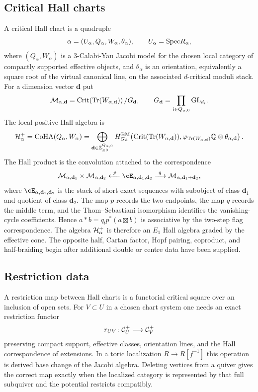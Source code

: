 \subsection*{Critical Hall charts}

A critical Hall chart is a quadruple
\[
  \alpha=(U_{\alpha},Q_{\alpha},W_{\alpha},\theta_{\alpha}),
  \qquad U_{\alpha}=\mathrm{Spec} R_{\alpha},
\]
where $(Q_{\alpha},W_{\alpha})$ is a $3$-Calabi-Yau Jacobi model for the
chosen local category of compactly supported effective objects, and
$\theta_{\alpha}$ is an orientation, equivalently a square root of the
virtual canonical line, on the associated $d$-critical moduli stack.  For
a dimension vector $\mathbf d$ put
\[
  \mathcal M_{\alpha,\mathbf d}
  =
  \mathrm{Crit}\!\left(\mathrm{Tr}(W_{\alpha,\mathbf d})\right)/
  G_{\mathbf d},
  \qquad
  G_{\mathbf d}=\prod_{i\in Q_{\alpha,0}}\mathrm{GL}_{d_i}.
\]
The local positive Hall algebra is
\[
  \mathcal H_{\alpha}^{+}
  =
  \mathrm{CoHA}(Q_{\alpha},W_{\alpha})
  =
  \bigoplus_{\mathbf d\in\mathbb Z_{\geq 0}^{Q_{\alpha,0}}}
  H^{\mathrm{BM}}_{G_{\mathbf d}}\!
  \left(
    \mathrm{Crit}(\mathrm{Tr}(W_{\alpha,\mathbf d})),
    \varphi_{\mathrm{Tr}(W_{\alpha,\mathbf d})}\mathbb Q\otimes\theta_{\alpha,\mathbf d}
  \right).
\]
The Hall product is the convolution attached to the correspondence
\[
  \cM_{\alpha,\mathbf d_1}\times\cM_{\alpha,\mathbf d_2}
  \xleftarrow{\ p\ }
  \cE_{\alpha,\mathbf d_1,\mathbf d_2}
  \xrightarrow{\ q\ }
  \cM_{\alpha,\mathbf d_1+\mathbf d_2},
\]
where $\cE_{\alpha,\mathbf d_1,\mathbf d_2}$ is the stack of short exact
sequences with subobject of class $\mathbf d_1$ and quotient of class
$\mathbf d_2$.  The map $p$ records the two endpoints, the map $q$
records the middle term, and the Thom--Sebastiani isomorphism identifies
the vanishing-cycle coefficients.  Hence $a*b=q_{!}p^{*}(a\boxtimes b)$
is associative by the two-step flag correspondence.  The algebra
$\mathcal H_{\alpha}^{+}$ is therefore an $E_1$ Hall algebra graded by the
effective cone.  The opposite half, Cartan factor, Hopf pairing,
coproduct, and half-braiding begin after additional double or centre
data have been supplied.

\subsection*{Restriction data}

A restriction map between Hall charts is a functorial critical square
over an inclusion of open sets.  For $V\subset U$ in a chosen chart
system one needs an exact restriction functor
\[
  r_{UV}\colon \mathcal C_{U}^{+}\longrightarrow \mathcal C_{V}^{+}
\]
preserving compact support, effective classes, orientation lines, and
the Hall correspondence of extensions.  In a toric localization
$R\to R[f^{-1}]$ this operation is derived base change of the Jacobi
algebra.  Deleting vertices from a quiver gives the correct map exactly
when the localized category is represented by that full subquiver and
the potential restricts compatibly.

